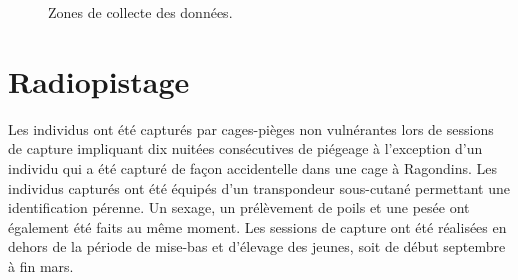 \documentclass[
  letterpaper,
  DIV=11,
  numbers=noendperiod]{scrreprt}
\begin{document}
\begin{figure}


\caption{\label{fig-zone-etude}Zones de collecte des données.}

\end{figure}%

\section{Radiopistage}\label{radiopistage}

Les individus ont été capturés par cages-pièges non vulnérantes lors de
sessions de capture impliquant dix nuitées consécutives de piégeage à
l'exception d'un individu qui a été capturé de façon accidentelle dans
une cage à Ragondins. Les individus capturés ont été équipés d'un
transpondeur sous-cutané permettant une identification pérenne. Un
sexage, un prélèvement de poils et une pesée ont également été faits au
même moment. Les sessions de capture ont été réalisées en dehors de la
période de mise-bas et d'élevage des jeunes, soit de début septembre à
fin mars.
\end{document}
